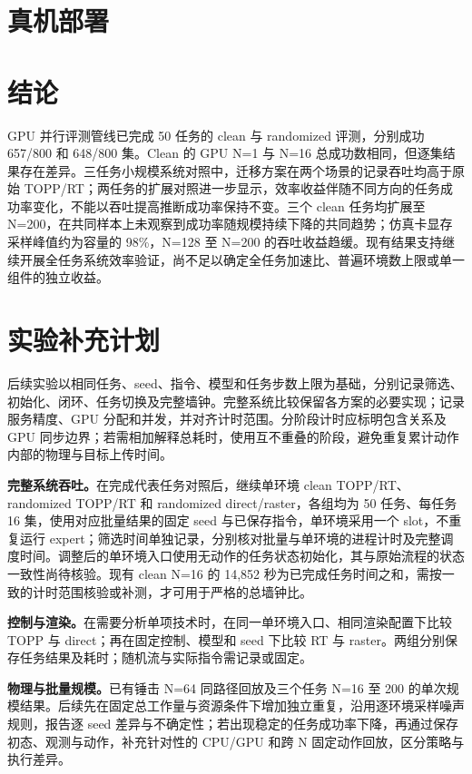 \documentclass{article}
\begin{document}
\section{真机部署}
\section{结论}
GPU 并行评测管线已完成 50 任务的 clean 与 randomized 评测，分别成功 657/800 和 648/800 集。Clean 的 GPU N=1 与 N=16 总成功数相同，但逐集结果存在差异。三任务小规模系统对照中，迁移方案在两个场景的记录吞吐均高于原始 TOPP/RT；两任务的扩展对照进一步显示，效率收益伴随不同方向的任务成功率变化，不能以吞吐提高推断成功率保持不变。三个 clean 任务均扩展至 N=200，在共同样本上未观察到成功率随规模持续下降的共同趋势；仿真卡显存采样峰值约为容量的 98\%，N=128 至 N=200 的吞吐收益趋缓。现有结果支持继续开展全任务系统效率验证，尚不足以确定全任务加速比、普遍环境数上限或单一组件的独立收益。

\section{实验补充计划}
后续实验以相同任务、seed、指令、模型和任务步数上限为基础，分别记录筛选、初始化、闭环、任务切换及完整墙钟。完整系统比较保留各方案的必要实现；记录服务精度、GPU 分配和并发，并对齐计时范围。分阶段计时应标明包含关系及 GPU 同步边界；若需相加解释总耗时，使用互不重叠的阶段，避免重复累计动作内部的物理与目标上传时间。

\textbf{完整系统吞吐。}在完成代表任务对照后，继续单环境 clean TOPP/RT、randomized TOPP/RT 和 randomized direct/raster，各组均为 50 任务、每任务 16 集，使用对应批量结果的固定 seed 与已保存指令，单环境采用一个 slot，不重复运行 expert；筛选时间单独记录，分别核对批量与单环境的进程计时及完整调度时间。调整后的单环境入口使用无动作的任务状态初始化，其与原始流程的状态一致性尚待核验。现有 clean N=16 的 14,852 秒为已完成任务时间之和，需按一致的计时范围核验或补测，才可用于严格的总墙钟比。

\textbf{控制与渲染。}在需要分析单项技术时，在同一单环境入口、相同渲染配置下比较 TOPP 与 direct；再在固定控制、模型和 seed 下比较 RT 与 raster。两组分别保存任务结果及耗时；随机流与实际指令需记录或固定。

\textbf{物理与批量规模。}已有锤击 N=64 同路径回放及三个任务 N=16 至 200 的单次规模结果。后续先在固定总工作量与资源条件下增加独立重复，沿用逐环境采样噪声规则，报告逐 seed 差异与不确定性；若出现稳定的任务成功率下降，再通过保存初态、观测与动作，补充针对性的 CPU/GPU 和跨 N 固定动作回放，区分策略与执行差异。
\end{document}
